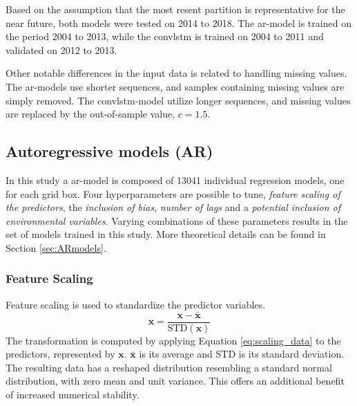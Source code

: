 Based on the assumption that the most resent partition is representative for the near future, both models were tested on 2014 to 2018. The \acrshort{ar}-model is trained on the period 2004 to 2013, while the \acrshort{convlstm} is trained on  2004 to 2011 and validated on 2012 to 2013.

Other notable differences in the input data is related to handling missing values.  
The \acrshort{ar}-models use shorter sequences, and samples containing missing values are simply removed. The \acrshort{convlstm}-model utilize longer sequences, and missing values are replaced by the out-of-sample value, $c=1.5$. 

\subsection{Autoregressive models (AR)}
In this study a \acrshort{ar}-model is composed of 13041 individual regression models, one for each grid box. Four hyperparameters are possible to tune, \textit{feature scaling of the predictors}, the \textit{inclusion of bias}, \textit{number of lags} and a \textit{potential inclusion of environmental variables}. Varying combinations of these parameters results in the set of models trained in this study. More theoretical details can be found in Section \ref{sec:ARmodels}. 

\subsubsection{Feature Scaling} \label{sec:scaling_predictors}
Feature scaling is used to standardize the predictor variables.
\begin{equation} \label{eq:scaling_data}
    \mathbf{x} = \frac{\mathbf{x} - \bar{\mathbf{x}}}{\text{STD}(\mathbf{x})}
\end{equation}
The transformation is computed by applying Equation \eqref{eq:scaling_data} to the predictors, represented by $\mathbf{x}$. $\bar{\mathbf{x}}$ is its average and STD is its standard deviation. The resulting data has a reshaped distribution resembling a standard normal distribution, with zero mean and unit variance. This offers an additional benefit of increased numerical stability. %


